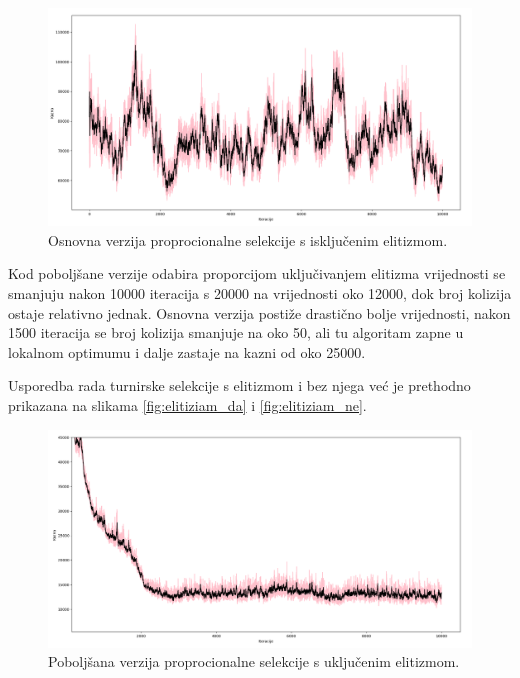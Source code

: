 \documentclass[times, utf8, zavrsni]{fer}
\begin{document}
\begin{figure}[htb]
\centering
\includegraphics[width=14cm]{images/proporcije_e_ne_gore.png}
\caption{Osnovna verzija proprocionalne selekcije s isključenim elitizmom.}
\label{fig:proporcije_e_ne_gore}
\end{figure}

\newpage

Kod poboljšane verzije odabira proporcijom uključivanjem elitizma vrijednosti se smanjuju nakon 10000 iteracija s 20000 na vrijednosti oko 12000, dok broj kolizija ostaje relativno jednak. Osnovna verzija postiže drastično bolje vrijednosti, nakon 1500 iteracija se broj kolizija smanjuje na oko 50, ali tu algoritam zapne u lokalnom optimumu i dalje zastaje na kazni od oko 25000.

Usporedba rada turnirske selekcije s elitizmom i bez njega već je prethodno prikazana na slikama \ref{fig:elitiziam_da} i \ref{fig:elitiziam_ne}.

\begin{figure}[htb]
\centering
\includegraphics[width=14cm]{images/proporcije_e_da.png}
\caption{Poboljšana verzija proprocionalne selekcije s uključenim elitizmom.}
\label{fig:prop_e_da}
\end{figure}
\end{document}
